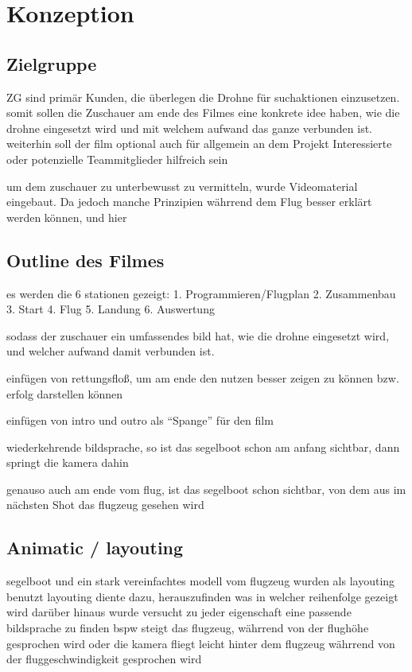 \chapter{Konzeption}
\label{ch:intro}
\section{Zielgruppe}
\label{sec:intro:motivation}


ZG sind primär Kunden, die überlegen die Drohne für suchaktionen einzusetzen.
somit sollen die Zuschauer am ende des Filmes eine konkrete idee haben, wie die drohne eingesetzt wird und mit welchem aufwand das ganze verbunden ist.
weiterhin soll der film optional auch für allgemein an dem Projekt Interessierte oder potenzielle Teammitglieder hilfreich sein

um dem zuschauer zu unterbewusst zu vermitteln, wurde Videomaterial eingebaut. Da jedoch manche Prinzipien währrend dem Flug besser erklärt werden können, und hier 


\section{Outline des Filmes}
\label{sec:intro:goal}
es werden die 6 stationen gezeigt:
1. Programmieren/Flugplan
2. Zusammenbau
3. Start
4. Flug
5. Landung
6. Auswertung

sodass der zuschauer ein umfassendes bild hat, wie die drohne eingesetzt wird, und welcher aufwand damit verbunden ist.

einfügen von rettungsfloß, um am ende den nutzen besser zeigen zu können
bzw. erfolg darstellen können

einfügen von intro und outro als ``Spange'' für den film

wiederkehrende bildsprache, so ist das segelboot schon am anfang sichtbar, dann springt die kamera dahin

genauso auch am ende vom flug, ist das segelboot schon sichtbar, von dem aus im nächsten Shot das flugzeug gesehen wird

\section{Animatic / layouting}
\label{sec:intro:structure}
segelboot und ein stark vereinfachtes modell vom flugzeug wurden als layouting benutzt
layouting diente dazu, herauszufinden was in welcher reihenfolge gezeigt wird
darüber hinaus wurde versucht zu jeder eigenschaft eine passende bildsprache zu finden
bspw steigt das flugzeug, währrend von der flughöhe gesprochen wird
oder die kamera fliegt leicht hinter dem flugzeug währrend von der fluggeschwindigkeit gesprochen wird

